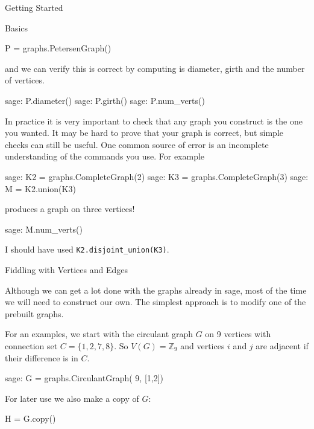 \begin{chap}{Getting Started}
\begin{sect}{Basics}
\begin{sageblock}
P = graphs.PetersenGraph()
\end{sageblock}
%
\begin{para}
and we can verify this is correct by computing is diameter, girth
and the number of vertices.
\end{para}
%
\begin{sageexample}
    sage: P.diameter()
    sage: P.girth()
    sage: P.num_verts()
\end{sageexample}
%
\begin{para}
In practice it is very important to check that any graph you construct is
the one you wanted.  It may be hard to prove that your graph is correct,
but simple checks can still be useful. One common source of error is an incomplete
understanding of the commands you use.  For example
\end{para}
%
\begin{sageexample}
    sage: K2 = graphs.CompleteGraph(2)
    sage: K3 = graphs.CompleteGraph(3)
    sage: M = K2.union(K3)
\end{sageexample}
%
\begin{para}
produces a graph on three vertices!
\end{para}
%
\begin{sageexample}
    sage: M.num_verts()
\end{sageexample}
\begin{para}
I should have used \verb|K2.disjoint_union(K3)|.
\end{para}
%
\end{sect}
%
\begin{sect}{Fiddling with Vertices and Edges}
%
\begin{para}
Although we can get a lot done with the graphs already in sage, most of the time
we will need to construct our own. The simplest approach is to modify one of 
the prebuilt graphs.
\end{para}
%
\begin{para}
For an examples, we start with the circulant graph $G$ on 9 vertices
with connection set $C=\{1,2,7,8\}$. So $V(G)=\mathbb{Z}_9$ and
vertices $i$ and $j$ are adjacent if their difference is in $C$.
\end{para}
%
\begin{sageexample}
    sage: G = graphs.CirculantGraph( 9, [1,2])
\end{sageexample}
For later use we also make a copy of $G$:
\begin{sageblock}
H = G.copy()
\end{sageblock}

\end{sect}
\end{chap}
